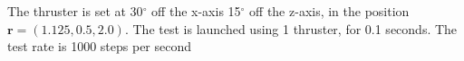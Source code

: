 The thruster is set at 30$^\circ$ off the x-axis 15$^\circ$ off the z-axis, in the position $\bm r = \left(1.125,0.5,2.0\right)$. The test is launched using 1 thruster, for 0.1 seconds. The test rate is 1000 steps per second